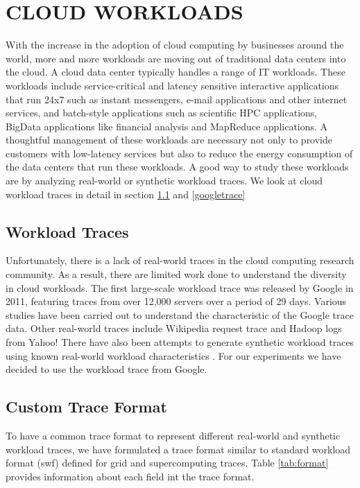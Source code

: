 \documentclass[letterpaper,twocolumn,10pt]{article}
\begin{document}
\fi





\section{CLOUD WORKLOADS } 
With the increase in the adoption of cloud computing by businesses around the world, more and more workloads are moving out of traditional data centers into the cloud. A cloud data center typically handles a range of IT workloads. These workloads include service-critical and latency sensitive interactive applications that run 24x7 such as instant messengers, e-mail applications and other internet services, and batch-style applications such as scientific HPC applications, BigData applications like financial analysis and MapReduce applications. A thoughtful management of these workloads are necessary not only to provide customers with low-latency services but also to reduce the energy consumption of the data centers that run these workloads. A good way to study these workloads are by analyzing real-world or synthetic workload traces. We look at cloud workload traces in detail in section \ref{traces} and \ref{googletrace}

\subsection{Workload Traces} \label{traces}
Unfortunately, there is a lack of real-world traces in the cloud computing research community. As a result, there are limited work done to understand the diversity in cloud workloads. The first large-scale workload trace was released by Google in 2011\cite{googletracedata}, featuring traces from over 12,000 servers over a period of 29 days. Various studies have been carried out to understand the characteristic of the Google trace data. Other real-world traces include Wikipedia request trace \cite{urdaneta2009wikipedia} and Hadoop logs from Yahoo! \cite{yahootrace}There have also been attempts to generate synthetic workload traces using known real-world workload characteristics \cite{beitch2010rain} \cite{wang2011towards}. For our experiments we have decided to use the workload trace from Google. 

\subsection{Custom Trace Format}
To have a common trace format to represent different real-world and synthetic workload traces, we have formulated a trace format similar to standard workload format (swf) \cite{chapin1999benchmarks} defined for grid and supercomputing traces. Table \ref{tab:format} provides information about each field int the trace format.
 
\end{document}
